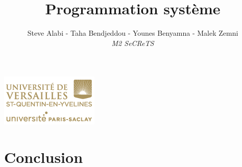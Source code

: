 
\usepackage[right=2.3cm, left=2.3cm, bottom=3cm, top=2.2cm, footskip=1.5cm,]{geometry}

\title{\vspace{15em}\textbf{\Huge Programmation système}}
\author{
	Steve Alabi - Taha Bendjeddou - Younes Benyamna - Malek Zemni
	\vspace{2em}\\
	\textit{M2 SeCReTS}
	\vspace{2em}
}


\clearpage
\maketitle\vspace{15em}
\begin{center}\includegraphics[scale=0.7]{../img/logo.png}\end{center}

\newpage
\tableofcontents

\newpage\clearpage{}

	
		
	
	
	
	
	
	
	
	
	\section*{Conclusion}

